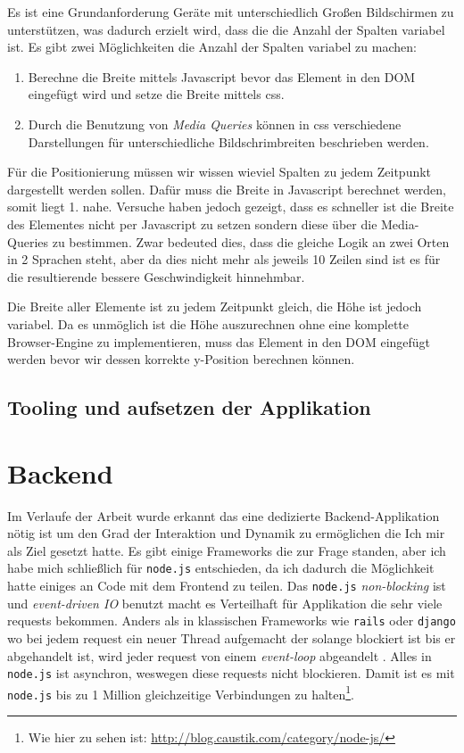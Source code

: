 \documentclass[12pt,twoside]{book}
\begin{document}
Es ist eine Grundanforderung Geräte mit unterschiedlich Großen Bildschirmen zu unterstützen, was dadurch erzielt wird, dass die die Anzahl der Spalten variabel ist.
Es gibt zwei Möglichkeiten die Anzahl der Spalten variabel zu machen:

\begin{enumerate}
  \item Berechne die Breite mittels Javascript bevor das Element in den DOM eingefügt wird und setze die Breite mittels css.
  \item Durch die Benutzung von \textit{Media Queries} können in css verschiedene Darstellungen für unterschiedliche Bildschrimbreiten beschrieben werden.
\end{enumerate}

Für die Positionierung müssen wir wissen wieviel Spalten zu jedem Zeitpunkt dargestellt werden sollen. Dafür muss die Breite in Javascript berechnet werden, somit liegt 1. nahe. Versuche haben jedoch gezeigt, dass es schneller ist die Breite des Elementes nicht per Javascript zu setzen sondern diese über die Media-Queries zu bestimmen. Zwar bedeuted dies, dass die gleiche Logik an zwei Orten in 2 Sprachen steht, aber da dies nicht mehr als jeweils 10 Zeilen sind ist es für die resultierende bessere Geschwindigkeit hinnehmbar.

Die Breite aller Elemente ist zu jedem Zeitpunkt gleich, die Höhe ist jedoch variabel. Da es unmöglich ist die Höhe auszurechnen ohne eine komplette Browser-Engine zu implementieren, muss das Element in den DOM eingefügt werden bevor wir dessen korrekte y-Position berechnen können.

\subsection{Tooling und aufsetzen der Applikation}


\section{Backend}

Im Verlaufe der Arbeit wurde erkannt das eine dedizierte Backend-Applikation nötig ist um den Grad der Interaktion und Dynamik zu ermöglichen die Ich mir als Ziel gesetzt hatte. Es gibt einige Frameworks die zur Frage standen, aber ich habe mich schließlich für \texttt{node.js} entschieden, da ich dadurch die Möglichkeit hatte einiges an Code mit dem Frontend zu teilen. Das \texttt{node.js} \textit{non-blocking} ist und \textit{event-driven IO} benutzt macht es Verteilhaft für Applikation die sehr viele requests bekommen. Anders als in klassischen Frameworks wie \texttt{rails} oder \texttt{django} wo bei jedem request ein neuer Thread aufgemacht der solange blockiert ist bis er abgehandelt ist, wird jeder request von einem \textit{event-loop} abgeandelt \citep{tilkov2010node}. Alles in \texttt{node.js} ist asynchron, weswegen diese requests nicht blockieren. Damit ist es mit \texttt{node.js} bis zu 1 Million gleichzeitige Verbindungen zu halten\footnote{Wie hier zu sehen ist: \url{http://blog.caustik.com/category/node-js/}}.
\end{document}
